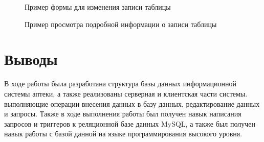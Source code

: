 \documentclass[a4paper]{article}
\begin{document}
				\begin{figure}[H]
					\centering
					\caption{Пример формы для изменения записи таблицы}
				\end{figure}
				
				\begin{figure}[H]
					\centering
					\caption{Пример просмотра подробной информации о записи таблицы}
				\end{figure}
		
	\newpage
				
	\section{Выводы}
		В ходе работы была разработана структура базы данных информационной системы аптеки, а также реализованы серверная и клиентская части системы. выполняющие операции внесения данных в базу данных, редактирование данных и запросы. Также в ходе выполнения работы был получен навык написания запросов и триггеров к реляционной базе данных MySQL, а также был получен навык работы с базой данной на языке программирования высокого уровня.
\end{document}
